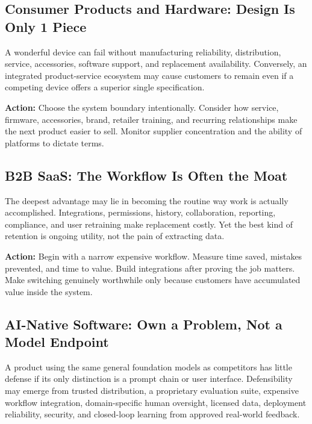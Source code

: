\subsection{Consumer Products and Hardware: Design Is Only 1 Piece}
\label{sec:consumer_hardware_design_only_one_piece}

A wonderful device can fail without manufacturing reliability, distribution, service, accessories, software support, and replacement availability. Conversely, an integrated product-service ecosystem may cause customers to remain even if a competing device offers a superior single specification.

\vspace{0.5em}
\noindent\textbf{Action:} Choose the system boundary intentionally. Consider how service, firmware, accessories, brand, retailer training, and recurring relationships make the next product easier to sell. Monitor supplier concentration and the ability of platforms to dictate terms.

\subsection{B2B SaaS: The Workflow Is Often the Moat}
\label{sec:b2b_saas_workflow_moat}

The deepest advantage may lie in becoming the routine way work is actually accomplished. Integrations, permissions, history, collaboration, reporting, compliance, and user retraining make replacement costly. Yet the best kind of retention is ongoing utility, not the pain of extracting data.

\vspace{0.5em}
\noindent\textbf{Action:} Begin with a narrow expensive workflow. Measure time saved, mistakes prevented, and time to value. Build integrations after proving the job matters. Make switching genuinely worthwhile only because customers have accumulated value inside the system.

\subsection{AI-Native Software: Own a Problem, Not a Model Endpoint}
\label{sec:ai_native_software_own_problem}

A product using the same general foundation models as competitors has little defense if its only distinction is a prompt chain or user interface. Defensibility may emerge from trusted distribution, a proprietary evaluation suite, expensive workflow integration, domain-specific human oversight, licensed data, deployment reliability, security, and closed-loop learning from approved real-world feedback.


